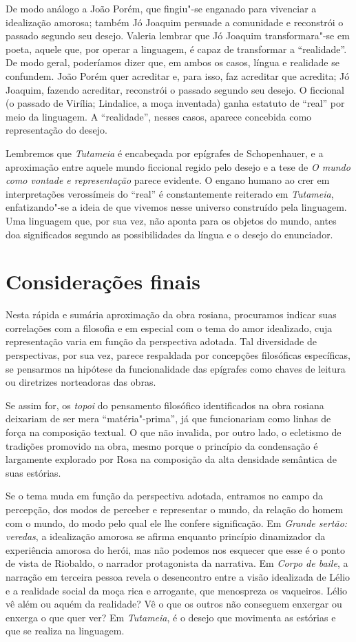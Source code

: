{De modo análogo a João Porém, que fingiu"-se enganado para vivenciar a
idealização amorosa; também Jó Joaquim persuade a comunidade e
reconstrói o passado segundo seu desejo. Valeria lembrar que Jó
Joaquim transformara"-se em poeta, aquele que, por operar a linguagem,
é capaz de transformar a “realidade”. De modo geral, poderíamos dizer
que, em ambos os casos, língua e realidade se confundem. João Porém
quer acreditar e, para isso, faz acreditar que acredita; Jó Joaquim,
fazendo acreditar, reconstrói o passado segundo seu desejo. O
ficcional (o passado de Virília; Lindalice, a moça inventada) ganha
estatuto de “real” por meio da linguagem. A “realidade”, nesses
casos, aparece concebida como representação do desejo.

Lembremos que \emph{Tutameia} é encabeçada por epígrafes de
Schopenhauer, e a aproximação entre aquele mundo ficcional regido
pelo desejo e a tese de \emph{O mundo como vontade e representação}
parece evidente. O engano humano ao crer em interpretações
verossímeis do “real” é constantemente reiterado em
\emph{Tutameia}, enfatizando"-se a ideia de que vivemos nesse
universo construído pela linguagem. Uma linguagem que, por sua vez,
não aponta para os objetos do mundo, antes doa significados segundo
as possibilidades da língua e o desejo do enunciador.

\section{Considerações finais}

Nesta rápida e sumária aproximação da obra rosiana, procuramos indicar
suas correlações com a filosofia e em especial com o tema do amor
idealizado, cuja representação varia em função da perspectiva
adotada. Tal diversidade de perspectivas, por sua vez, parece
respaldada por concepções filosóficas específicas, se pensarmos na
hipótese da funcionalidade das epígrafes como chaves de leitura ou
diretrizes norteadoras das obras.

Se assim for, os \emph{topoi} do pensamento filosófico identificados
na obra rosiana deixariam de ser mera “matéria"-prima”, já que
funcionariam como linhas de força na composição textual. O que não
invalida, por outro lado, o ecletismo de tradições promovido na obra,
mesmo porque o princípio da condensação é largamente explorado por
Rosa na composição da alta densidade semântica de suas estórias.

Se o tema muda em função da perspectiva adotada, entramos no campo da
percepção, dos modos de perceber e representar o mundo, da relação do
homem com o mundo, do modo pelo qual ele lhe confere significação. Em
\emph{Grande sertão: veredas}, a idealização amorosa se afirma
enquanto princípio dinamizador da experiência amorosa do herói, mas
não podemos nos esquecer que esse é o ponto de vista de Riobaldo, o
narrador protagonista da narrativa. Em \emph{Corpo de baile}, a
narração em terceira pessoa revela o desencontro entre a visão
idealizada de Lélio e a realidade social da moça rica e arrogante,
que menospreza os vaqueiros. Lélio vê além ou aquém da realidade? Vê
o que os outros não conseguem enxergar ou enxerga o que quer ver? Em
\emph{Tutameia}, é o desejo que movimenta as estórias e que se
realiza na linguagem.

}

